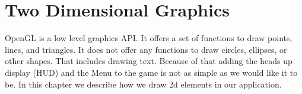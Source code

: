 \section*{Two Dimensional Graphics} \label{chap:two_dimensional_graphics}
OpenGL is a low level graphics API.
It offers a set of functions to draw points, lines, and triangles.
It does not offer any functions to draw circles, ellipses, or other shapes.
That includes drawing text. 
Because of that adding the heads up display (HUD) and the Menu to the game is not as simple as we would like it to be.
In this chapter we describe how we draw 2d elements in our application.



